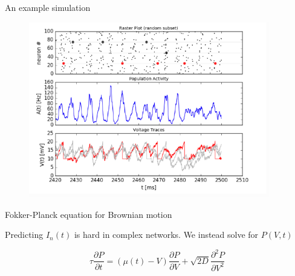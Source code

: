 \documentclass[aspectratio=169]{beamer}
\begin{document}
\begin{frame}{An example simulation}

\begin{figure}
\centering
\includegraphics[width=105mm]{figure-24}
\end{figure}

\end{frame}


\begin{frame}{Fokker-Planck equation for Brownian motion}

\begin{figure}
\centering
{}
\end{figure}

Predicting $I_{n}(t)$ is hard in complex networks. We instead solve for $P(V,t)$

\begin{equation*}
\tau\frac{\partial P}{\partial t} = (\mu(t)-V)\frac{\partial P}{\partial V} + \sqrt{2D}\frac{\partial^{2}P}{\partial V^{2}}
\end{equation*}

\end{frame}
\end{document}
